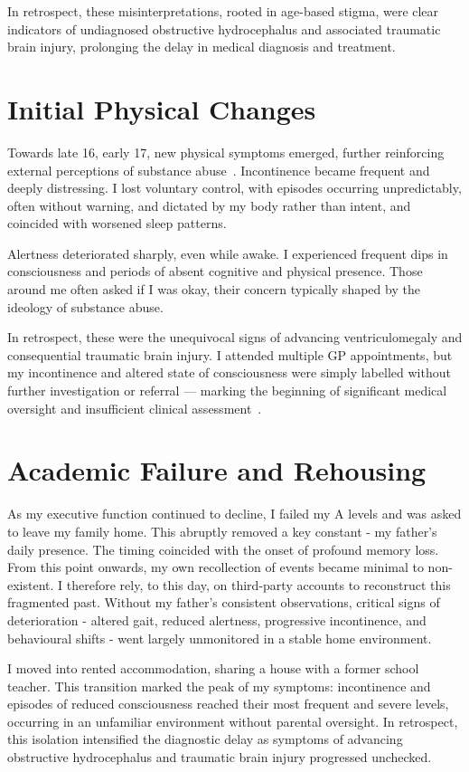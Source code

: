 \documentclass{article}
\begin{document}
In retrospect, these misinterpretations, rooted in age-based stigma, were clear indicators of undiagnosed obstructive hydrocephalus and associated traumatic brain injury, prolonging the delay in medical diagnosis and treatment.

\section*{Initial Physical Changes}
Towards late 16, early 17, new physical symptoms emerged, further reinforcing external perceptions of substance abuse~\cite{yang2017,hammarlund2018,zwick2020,mcginty2020,bielenberg2021,lankenau2012}. Incontinence became frequent and deeply distressing. I lost voluntary control, with episodes occurring unpredictably, often without warning, and dictated by my body rather than intent, and coincided with worsened sleep patterns.

Alertness deteriorated sharply, even while awake. I experienced frequent dips in consciousness and periods of absent cognitive and physical presence. Those around me often asked if I was okay, their concern typically shaped by the ideology of substance abuse.

In retrospect, these were the unequivocal signs of advancing ventriculomegaly and consequential traumatic brain injury. I attended multiple GP appointments, but my incontinence and altered state of consciousness were simply labelled without further investigation or referral — marking the beginning of significant medical oversight and insufficient clinical assessment~\cite{jones2008,shefer2014,ali2021}.

\section*{Academic Failure and Rehousing}
As my executive function continued to decline, I failed my A levels and was asked to leave my family home. This abruptly removed a key constant - my father’s daily presence. The timing coincided with the onset of profound memory loss. From this point onwards, my own recollection of events became minimal to non-existent. I therefore rely, to this day, on third-party accounts to reconstruct this fragmented past. Without my father’s consistent observations, critical signs of deterioration - altered gait, reduced alertness, progressive incontinence, and behavioural shifts - went largely unmonitored in a stable home environment.

I moved into rented accommodation, sharing a house with a former school teacher. This transition marked the peak of my symptoms: incontinence and episodes of reduced consciousness reached their most frequent and severe levels, occurring in an unfamiliar environment without parental oversight. In retrospect, this isolation intensified the diagnostic delay as symptoms of advancing obstructive hydrocephalus and traumatic brain injury progressed unchecked.
\end{document}
